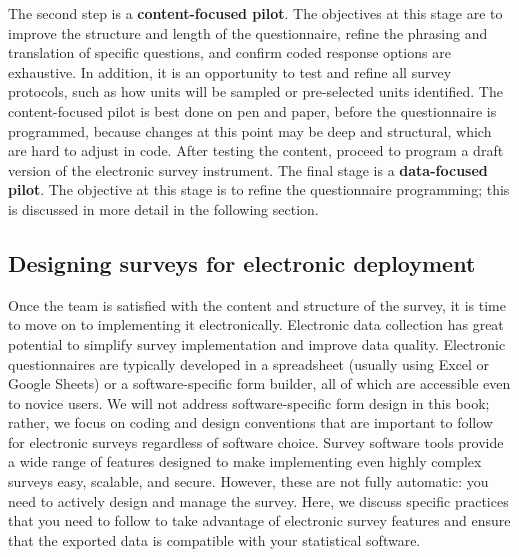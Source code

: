 The second step is a \textbf{content-focused pilot}.
The objectives at this stage are to improve the structure and length of the questionnaire,
refine the phrasing and translation of specific questions,
and confirm coded response options are exhaustive.
In addition, it is an opportunity to test and refine all survey protocols,
such as how units will be sampled or pre-selected units identified.
The content-focused pilot is best done on pen and paper, before the questionnaire is programmed,
because changes at this point may be deep and structural,
which are hard to adjust in code.
After testing the content, proceed to program a draft version
of the electronic survey instrument.
The final stage is a \textbf{data-focused pilot}.
The objective at this stage is to refine the questionnaire programming;
this is discussed in more detail in the following section.


\subsection{Designing surveys for electronic deployment}
Once the team is satisfied with the content and structure of the survey,
it is time to move on to implementing it electronically.
Electronic data collection has great potential
to simplify survey implementation and improve data quality.
Electronic questionnaires are typically developed
in a spreadsheet (usually using Excel or Google Sheets)
or a software-specific form builder,
all of which are accessible even to novice users.
We will not address software-specific form design in this book;
rather, we focus on coding and design conventions that are important to follow
for electronic surveys regardless of software choice.
Survey software tools provide a wide range of features
designed to make implementing even highly complex surveys
easy, scalable, and secure.
However, these are not fully automatic:
you need to actively design and manage the survey.
Here, we discuss specific practices that you need to follow
to take advantage of electronic survey features
and ensure that the exported data
is compatible with your statistical software.

